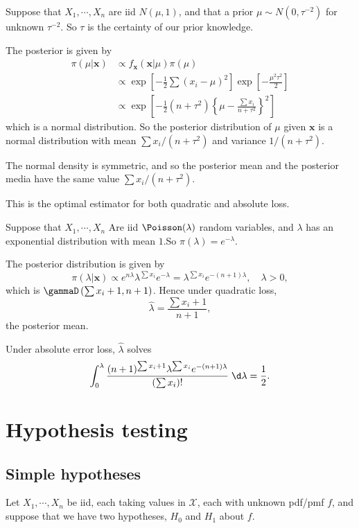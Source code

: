 \documentclass[a4paper]{article}
\begin{document}
\begin{eg}
  Suppose that $X_1, \cdots , X_n$ are iid $N(\mu, 1)$, and that a prior $\mu\sim N(0, \tau^{-2})$ for unknown $\tau^{-2}$. So $\tau$ is the certainty of our prior knowledge.

  The posterior is given by
  \begin{align*}
    \pi(\mu|\mathbf{x})&\propto f_\mathbf{x}(\mathbf{x}|\mu)\pi(\mu)\\
    &\propto \exp\left[-\frac{1}{2}\sum(x_i - \mu)^2\right]\exp\left[-\frac{\mu^2\tau^2}{2}\right]\\
    &\propto \exp\left[-\frac{1}{2}(n + \tau^2)\left\{\mu - \frac{\sum x_i}{n + \tau^2}\right\}^2\right]
  \end{align*}
  which is a normal distribution. So the posterior distribution of $\mu$ given $\mathbf{x}$ is a normal distribution with mean $\sum x_i/(n + \tau^2)$ and variance $1/(n + \tau^2)$.

  The normal density is symmetric, and so the posterior mean and the posterior media have the same value $\sum x_i/(n + \tau^2)$.

  This is the optimal estimator for both quadratic and absolute loss.
\end{eg}

\begin{eg}
  Suppose that $X_1, \cdots, X_n$ Are iid $\Poisson(\lambda)$ random variables, and $\lambda$ has an exponential distribution with mean $1$.So $\pi(\lambda) = e^{-\lambda}.$

  The posterior distribution is given by
  \[
    \pi(\lambda|\mathbf{x}) \propto e^{n\lambda} \lambda^{\sum x_i}e^{-\lambda} = \lambda^{\sum x_i}e^{-(n + 1)\lambda},\quad \lambda > 0,
  \]
  which is $\gammaD\left(\sum x_i + 1, n + 1\right)$. Hence under quadratic loss,
  \[
    \hat{\lambda} = \frac{\sum x_i + 1}{n + 1},
  \]
  the posterior mean.

  Under absolute error loss, $\hat{\lambda}$ solves
  \[
    \int_0^{\lambda} \frac{(n + 1)^{\sum x_i + 1}\lambda^{\sum x_i}e ^{-(n + 1)\lambda}}{(\sum x_i)!}\;\d \lambda = \frac{1}{2}.
  \]
\end{eg}

\section{Hypothesis testing}
\subsection{Simple hypotheses}
Let $X_1, \cdots, X_n$ be iid, each taking values in $\mathcal{X}$, each with unknown pdf/pmf $f$, and suppose that we have two hypotheses, $H_0$ and $H_1$ about $f$.
\end{document}
